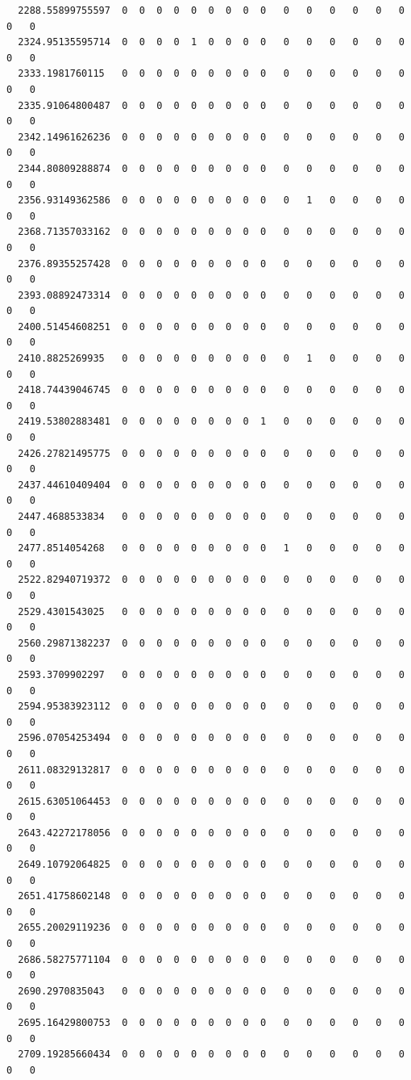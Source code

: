\documentclass[
  letterpaper,
  DIV=11,
  numbers=noendperiod]{scrartcl}
\begin{document}
\begin{verbatim}
  2288.55899755597  0  0  0  0  0  0  0  0  0   0   0   0   0   0   0   0   0
  2324.95135595714  0  0  0  0  1  0  0  0  0   0   0   0   0   0   0   0   0
  2333.1981760115   0  0  0  0  0  0  0  0  0   0   0   0   0   0   0   0   0
  2335.91064800487  0  0  0  0  0  0  0  0  0   0   0   0   0   0   0   0   0
  2342.14961626236  0  0  0  0  0  0  0  0  0   0   0   0   0   0   0   0   0
  2344.80809288874  0  0  0  0  0  0  0  0  0   0   0   0   0   0   0   0   0
  2356.93149362586  0  0  0  0  0  0  0  0  0   0   1   0   0   0   0   0   0
  2368.71357033162  0  0  0  0  0  0  0  0  0   0   0   0   0   0   0   0   0
  2376.89355257428  0  0  0  0  0  0  0  0  0   0   0   0   0   0   0   0   0
  2393.08892473314  0  0  0  0  0  0  0  0  0   0   0   0   0   0   0   0   0
  2400.51454608251  0  0  0  0  0  0  0  0  0   0   0   0   0   0   0   0   0
  2410.8825269935   0  0  0  0  0  0  0  0  0   0   1   0   0   0   0   0   0
  2418.74439046745  0  0  0  0  0  0  0  0  0   0   0   0   0   0   0   0   0
  2419.53802883481  0  0  0  0  0  0  0  0  1   0   0   0   0   0   0   0   0
  2426.27821495775  0  0  0  0  0  0  0  0  0   0   0   0   0   0   0   0   0
  2437.44610409404  0  0  0  0  0  0  0  0  0   0   0   0   0   0   0   0   0
  2447.4688533834   0  0  0  0  0  0  0  0  0   0   0   0   0   0   0   0   0
  2477.8514054268   0  0  0  0  0  0  0  0  0   1   0   0   0   0   0   0   0
  2522.82940719372  0  0  0  0  0  0  0  0  0   0   0   0   0   0   0   0   0
  2529.4301543025   0  0  0  0  0  0  0  0  0   0   0   0   0   0   0   0   0
  2560.29871382237  0  0  0  0  0  0  0  0  0   0   0   0   0   0   0   0   0
  2593.3709902297   0  0  0  0  0  0  0  0  0   0   0   0   0   0   0   0   0
  2594.95383923112  0  0  0  0  0  0  0  0  0   0   0   0   0   0   0   0   0
  2596.07054253494  0  0  0  0  0  0  0  0  0   0   0   0   0   0   0   0   0
  2611.08329132817  0  0  0  0  0  0  0  0  0   0   0   0   0   0   0   0   0
  2615.63051064453  0  0  0  0  0  0  0  0  0   0   0   0   0   0   0   0   0
  2643.42272178056  0  0  0  0  0  0  0  0  0   0   0   0   0   0   0   0   0
  2649.10792064825  0  0  0  0  0  0  0  0  0   0   0   0   0   0   0   0   0
  2651.41758602148  0  0  0  0  0  0  0  0  0   0   0   0   0   0   0   0   0
  2655.20029119236  0  0  0  0  0  0  0  0  0   0   0   0   0   0   0   0   0
  2686.58275771104  0  0  0  0  0  0  0  0  0   0   0   0   0   0   0   0   0
  2690.2970835043   0  0  0  0  0  0  0  0  0   0   0   0   0   0   0   0   0
  2695.16429800753  0  0  0  0  0  0  0  0  0   0   0   0   0   0   0   0   0
  2709.19285660434  0  0  0  0  0  0  0  0  0   0   0   0   0   0   0   0   0

\end{verbatim}
\end{document}
